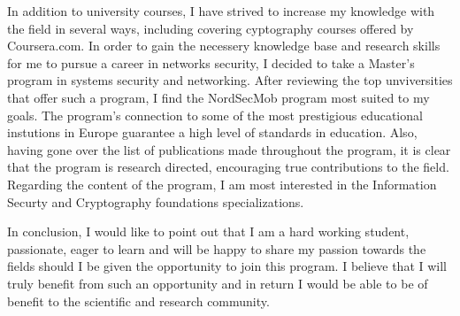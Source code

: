 \documentclass[10pt,stdletter,dateno,sigleft]{newlfm} %
\begin{document}
\begin{newlfm}
  In addition to university courses, I have strived to increase my knowledge
  with the field in several ways, including covering cyptography courses
  offered by Coursera.com. In order to gain the necessery knowledge base and
  research skills for me to pursue a career in networks security, I decided to
  take a Master's program in systems security and networking. After reviewing
  the top unviversities that offer such a program, I find the NordSecMob program
  most suited to my goals. The program's connection to some of the most
  prestigious educational instutions in Europe guarantee a high level of
  standards in education. Also, having gone over the list of publications made
  throughout the program, it is clear that the program is research directed,
  encouraging true contributions to the field. Regarding the content of the
  program, I am most interested in the Information Securty and Cryptography
  foundations specializations.
  
  In conclusion, I would like to point out that I am a hard working student,
  passionate, eager to learn and will be happy to share my passion towards the
  fields should I be given the  opportunity to join this program. I believe
  that I will truly benefit from
  such an opportunity and in return I would be able to be of benefit to the
  scientific and research community.

\end{newlfm}
\end{document}
